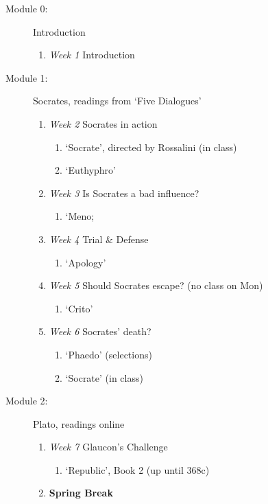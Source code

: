 \documentclass[article,oneside]{memoir}
\begin{document}
\begin{description}
\item[Module 0:] {Introduction}
\begin{enumerate}
\item \textit{Week 1} Introduction 
\end{enumerate}

\item[Module 1:] Socrates, readings from `Five Dialogues'
\begin{enumerate}
\item \textit{Week 2} Socrates in action
\begin{enumerate}
\item `Socrate', directed by Rossalini (in class)
\item `Euthyphro'
\end{enumerate}

\item \textit{Week 3} Is Socrates a bad influence? 
\begin{enumerate}
\item `Meno;
\end{enumerate}

\item \textit{Week 4} Trial \& Defense
\begin{enumerate}
\item `Apology'
\end{enumerate}

\item \textit{Week 5} Should Socrates escape? (no class on Mon)
\begin{enumerate}
\item `Crito'
\end{enumerate}
\item \textit{Week 6} Socrates' death? 
\begin{enumerate}
\item `Phaedo' (selections)
\item `Socrate' (in class) 
\end{enumerate}
\end{enumerate}


\item[Module 2:] Plato, readings online
\begin{enumerate}
\item \textit{Week 7} Glaucon's Challenge
\begin{enumerate}
\item `Republic', Book 2 (up until 368c) 
\end{enumerate}
\item \textbf{Spring Break}


\end{enumerate}
\end{description}
\end{document}
